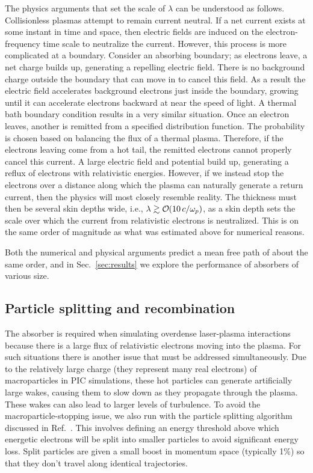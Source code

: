 \documentclass[../absorber.tex]{subfiles}
\begin{document}
The physics arguments that set the scale of $\lambda$ can be understood as follows. Collisionless plasmas attempt to remain current neutral. If a net current exists at some instant in time and space, then electric fields are induced on the electron-frequency time scale to neutralize the current. However, this process is more complicated at a boundary. Consider an absorbing boundary; as electrons leave, a net charge builds up, generating a repelling electric field. There is no background charge outside the boundary that can move in to cancel this field. As a result the electric field accelerates background electrons just inside the boundary, growing until it can accelerate electrons backward at near the speed of light. A thermal bath boundary condition results in a very similar situation. Once an electron leaves, another is remitted from a specified distribution function. The probability is chosen based on balancing the flux of a thermal plasma. Therefore, if the electrons leaving come from a hot tail, the remitted electrons cannot properly cancel this current.  A large electric field and potential build up, generating a reflux of electrons with relativistic energies.  However, if we instead stop the electrons over a distance along which the plasma can naturally generate a return current, then the physics will most closely resemble reality. The thickness must then be several skin depths wide, i.e., $\lambda \gtrsim \bigO(10\,c/\omega_p)$, as a skin depth sets the scale over which the current from relativistic electrons is neutralized. This is on the same order of magnitude as what was estimated above for numerical reasons.

Both the numerical and physical arguments predict a mean free path of about the same order, and in Sec.~\ref{sec:results} we explore the performance of absorbers of various size.

\subsection{Particle splitting and recombination}

The absorber is required when simulating overdense laser-plasma interactions because there is a large flux of relativistic electrons moving into the plasma. For such situations there is another issue that must be addressed simultaneously. Due to the relatively large charge (they represent many real electrons) of macroparticles in PIC simulations, these hot particles can generate artificially large wakes, causing them to slow down as they propagate through the plasma.\cite{Tonge2009ALasers,May2014}  These wakes can also lead to larger levels of turbulence. To avoid the macroparticle-stopping issue, we also run with the particle splitting algorithm discussed in Ref.~.  This involves defining an energy threshold above which energetic electrons will be split into smaller particles to avoid significant energy loss.  Split particles are given a small boost in momentum space (typically 1\%) so that they don't travel along identical trajectories.
\end{document}
